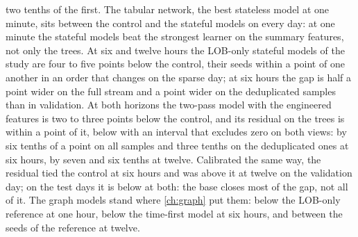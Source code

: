 two tenths of the first.  The tabular network, the best stateless model at one minute, sits
between the control and the stateful models on every day: at one minute the stateful
models beat the strongest learner on the summary features, not only the trees.  At six and
twelve hours the LOB-only stateful models of the study are four to five points below the
control, their seeds within a point of one another in an order that changes on the sparse
day; at six hours the gap is half a point wider on the full stream and a point wider on the
deduplicated samples than in validation.  At both horizons the two-pass model with the
engineered features is two to three points below the control, and its residual on the trees
is within a point of it, below with an interval that excludes zero on both views: by six
tenths of a point on all samples and three tenths on the deduplicated ones at six hours, by
seven and six tenths at twelve.  Calibrated the same way, the residual tied the control at
six hours and was above it at twelve on the validation day; on the test days it is below at
both: the base closes most of the gap, not all of it.  The graph models stand where \cref{ch:graph} put them: below the LOB-only
reference at one hour, below the time-first model at six hours, and between the seeds of
the reference at twelve.

